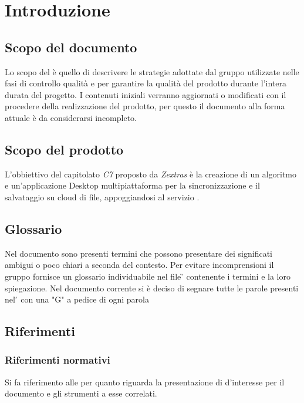 \section{Introduzione}
\subsection{Scopo del documento}

Lo scopo del  \PdQ{}  è quello di descrivere le strategie adottate dal gruppo \gruppo{} utilizzate nelle fasi di controllo qualità e  per garantire la qualità del prodotto durante l'intera durata del progetto.  I contenuti iniziali verranno aggiornati o modificati con il procedere della realizzazione del prodotto,  per questo il documento alla forma attuale è da considerarsi incompleto.  

\subsection{Scopo del prodotto}

L'obbiettivo del capitolato \textit{C7} proposto da \textit{Zextras} è la creazione di  un algoritmo e un'applicazione Desktop multipiattaforma per la sincronizzazione e il salvataggio su cloud di file,  appoggiandosi al servizio .  

\subsection{Glossario}

Nel documento sono presenti termini che possono presentare dei significati ambigui o poco chiari a seconda del contesto. Per evitare incomprensioni il gruppo fornisce un glossario individuabile nel file \G{} \versGlo{} contenente i termini e la loro spiegazione. Nel documento corrente si è deciso di segnare tutte le parole presenti nel \G{} con una "G" a pedice di ogni parola

\subsection{Riferimenti}
\subsubsection{Riferimenti normativi}
Si fa riferimento alle \NdP{} \versNdP{} per quanto riguarda la presentazione di  d'interesse per il documento e gli strumenti a esse correlati. 
